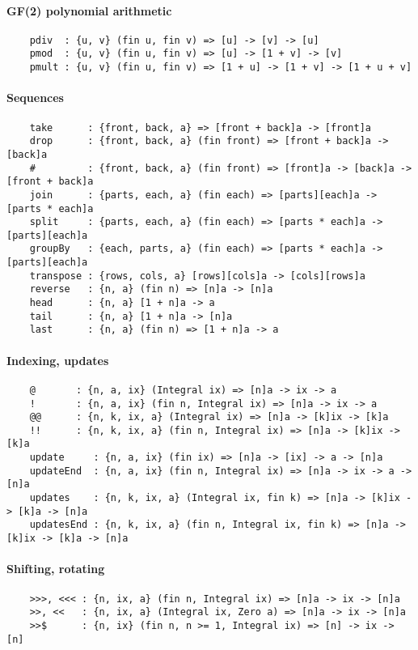 \paragraph*{GF(2) polynomial arithmetic}
\begin{Verbatim}
    pdiv  : {u, v} (fin u, fin v) => [u] -> [v] -> [u]
    pmod  : {u, v} (fin u, fin v) => [u] -> [1 + v] -> [v]
    pmult : {u, v} (fin u, fin v) => [1 + u] -> [1 + v] -> [1 + u + v]
\end{Verbatim}
\paragraph*{Sequences}
\begin{Verbatim}
    take      : {front, back, a} => [front + back]a -> [front]a
    drop      : {front, back, a} (fin front) => [front + back]a -> [back]a
    #         : {front, back, a} (fin front) => [front]a -> [back]a -> [front + back]a
    join      : {parts, each, a} (fin each) => [parts][each]a -> [parts * each]a
    split     : {parts, each, a} (fin each) => [parts * each]a -> [parts][each]a
    groupBy   : {each, parts, a} (fin each) => [parts * each]a -> [parts][each]a
    transpose : {rows, cols, a} [rows][cols]a -> [cols][rows]a
    reverse   : {n, a} (fin n) => [n]a -> [n]a
    head      : {n, a} [1 + n]a -> a
    tail      : {n, a} [1 + n]a -> [n]a
    last      : {n, a} (fin n) => [1 + n]a -> a
\end{Verbatim}
\paragraph*{Indexing, updates}
\begin{Verbatim}
    @       : {n, a, ix} (Integral ix) => [n]a -> ix -> a
    !       : {n, a, ix} (fin n, Integral ix) => [n]a -> ix -> a
    @@      : {n, k, ix, a} (Integral ix) => [n]a -> [k]ix -> [k]a
    !!      : {n, k, ix, a} (fin n, Integral ix) => [n]a -> [k]ix -> [k]a
    update     : {n, a, ix} (fin ix) => [n]a -> [ix] -> a -> [n]a
    updateEnd  : {n, a, ix} (fin n, Integral ix) => [n]a -> ix -> a -> [n]a
    updates    : {n, k, ix, a} (Integral ix, fin k) => [n]a -> [k]ix -> [k]a -> [n]a
    updatesEnd : {n, k, ix, a} (fin n, Integral ix, fin k) => [n]a -> [k]ix -> [k]a -> [n]a
\end{Verbatim}
\paragraph*{Shifting, rotating}
\begin{Verbatim}
    >>>, <<< : {n, ix, a} (fin n, Integral ix) => [n]a -> ix -> [n]a
    >>, <<   : {n, ix, a} (Integral ix, Zero a) => [n]a -> ix -> [n]a
    >>$      : {n, ix} (fin n, n >= 1, Integral ix) => [n] -> ix -> [n]
\end{Verbatim}
